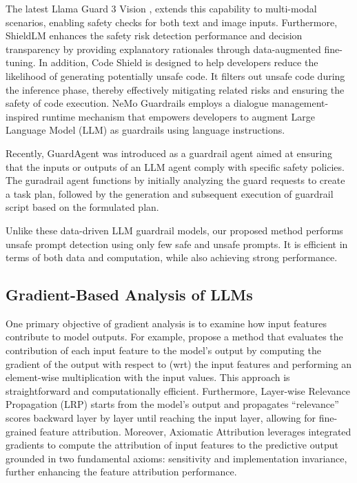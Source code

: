 The latest Llama Guard 3 Vision \citep{chi2024llama}, extends this capability to multi-modal scenarios, enabling safety checks for both text and image inputs. Furthermore, ShieldLM \citep{DBLP:conf/emnlp/ZhangLMZLKSSSWH24} enhances the safety risk detection performance and decision transparency by providing explanatory rationales through data-augmented fine-tuning. In addition, Code Shield \citep{inan2023llama} is designed to help developers reduce the likelihood of generating potentially unsafe code. It filters out unsafe code during the inference phase, thereby effectively mitigating related risks and ensuring the safety of code execution. NeMo Guardrails \citep{rebedea2023nemo} employs a dialogue management-inspired runtime mechanism that empowers developers to augment Large Language Model (LLM) as guardrails using language instructions. 

Recently, GuardAgent \citep{xiang2024guardagent} was introduced as a guardrail agent aimed at ensuring that the inputs or outputs of an LLM agent comply with specific safety policies. The guradrail agent functions by initially analyzing the guard requests to create a task plan, followed by the generation and subsequent execution of guardrail script based on the formulated plan. 

Unlike these data-driven LLM guardrail models, our proposed method performs unsafe prompt detection using only few safe and unsafe prompts. It is efficient in terms of both data and computation, while also achieving strong performance. 

\subsection{Gradient-Based Analysis of LLMs}
One primary objective of gradient analysis is to examine how input features contribute to model outputs. For example, \citet{shrikumar2016not} propose a method that evaluates the contribution of each input feature to the model’s output by computing the gradient of the output with respect to (wrt) the input features and performing an element-wise multiplication with the input values. This approach is straightforward and computationally efficient. Furthermore, Layer-wise Relevance Propagation (LRP) \citep{bach2015pixel} starts from the model's output and propagates ``relevance'' scores backward layer by layer until reaching the input layer, allowing for fine-grained feature attribution. Moreover, Axiomatic Attribution \citep{pmlr-v70-sundararajan17a} leverages integrated gradients to compute the attribution of input features to the predictive output grounded in two fundamental axioms: sensitivity and implementation invariance, further enhancing the feature attribution performance.


